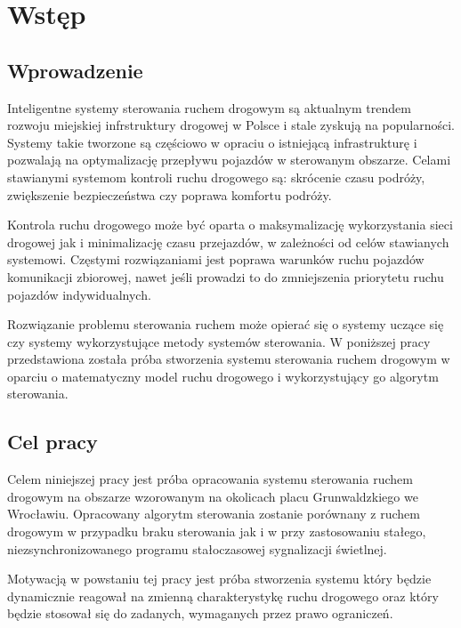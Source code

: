 \chapter{Wstęp}
\section{Wprowadzenie}
Inteligentne systemy sterowania ruchem drogowym są aktualnym trendem rozwoju miejskiej infrstruktury drogowej w Polsce i stale zyskują na popularności.
Systemy takie tworzone są częściowo w opraciu o istniejącą infrastrukturę i pozwalają na optymalizację przepływu pojazdów w sterowanym obszarze.
Celami stawianymi systemom kontroli ruchu drogowego są: skrócenie czasu podróży, zwiększenie bezpieczeństwa czy poprawa komfortu podróży.

Kontrola ruchu drogowego może być oparta o maksymalizację wykorzystania sieci drogowej jak i minimalizację czasu przejazdów, w zależności od celów stawianych systemowi. Częstymi rozwiązaniami jest poprawa warunków ruchu pojazdów komunikacji zbiorowej, nawet jeśli prowadzi to do zmniejszenia priorytetu ruchu pojazdów indywidualnych.

Rozwiązanie problemu sterowania ruchem może opierać się o systemy uczące się czy systemy wykorzystujące metody systemów sterowania. W poniższej pracy przedstawiona została próba stworzenia systemu sterowania ruchem drogowym w oparciu o matematyczny model ruchu drogowego i wykorzystujący go algorytm sterowania.

\section{Cel pracy}
Celem niniejszej pracy jest próba opracowania systemu sterowania ruchem drogowym na obszarze wzorowanym na okolicach placu Grunwaldzkiego we Wrocławiu. Opracowany algorytm sterowania zostanie porównany z ruchem drogowym w przypadku braku sterowania jak i w przy zastosowaniu stałego, niezsynchronizowanego programu stałoczasowej sygnalizacji świetlnej.

Motywacją w powstaniu tej pracy jest próba stworzenia systemu który będzie dynamicznie reagował na zmienną charakterystykę ruchu drogowego oraz który będzie stosował się do zadanych, wymaganych przez prawo ograniczeń.
